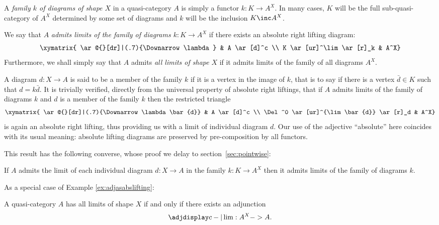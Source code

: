 \begin{defn}\label{defn:families.of.diagrams}
  A {\em family $k$ of diagrams of shape $X$\/} in a quasi-category $A$ is simply a functor $k\colon K\to A^X$. In many cases, $K$ will  be the full sub-quasi-category of $A^X$ determined by some set of diagrams and $k$ will be the inclusion $K\inc A^X$.

  We say that $A$ {\em admits limits of the family of diagrams $k\colon K\to A^X$\/} if there exists an absolute right lifting diagram:
\begin{equation}\label{eq:limits.of.a.family}
      \xymatrix{ \ar@{}[dr]|(.7){\Downarrow\lambda} & A \ar[d]^c \\ K \ar[ur]^\lim \ar[r]_k & A^X}
\end{equation}
  Furthermore, we shall simply say that $A$ admits {\em all limits of shape\/} $X$ if it admits limits of the family of all diagrams $A^X$. 

  A diagram $d\colon X\to A$ is said to be a member of the family $k$ if it is a vertex in the image of $k$, that is to say if there is a vertex $\bar{d}\in K$ such that $d=k\bar{d}$. It is trivially verified, directly from the universal property of absolute right liftings, that if $A$ admits limits of the family of diagrams $k$ and $d$ is a member of the family $k$ then the restricted triangle
  \begin{equation*}
      \xymatrix{ \ar@{}[dr]|(.7){\Downarrow\lambda\bar{d}} & A \ar[d]^c \\ \Del^0 \ar[ur]^{\lim \bar{d}} \ar[r]_d & A^X}
  \end{equation*}
  is again an absolute right lifting, thus providing us with a limit of individual diagram $d$. Our use of the adjective ``absolute'' here coincides with its usual meaning: absolute lifting diagrams are preserved by pre-composition by all functors.
\end{defn}

This result has the following converse, whose proof we delay to section~\ref{sec:pointwise}:

\begin{prop}\label{prop:families.of.diagrams}
  If $A$ admits the limit of each individual diagram $d\colon X\to A$ in the family $k\colon K\to A^X$ then it admits limits of the family of diagrams $k$.
\end{prop}

As a special case of Example \ref{ex:adjasabslifting}:

\begin{prop}\label{prop:limitsasadjunctions} A quasi-category $A$ has all limits of shape $X$ if and only if there exists an adjunction \[ \adjdisplay c -| \lim : A^X -> A.\]
\end{prop}

